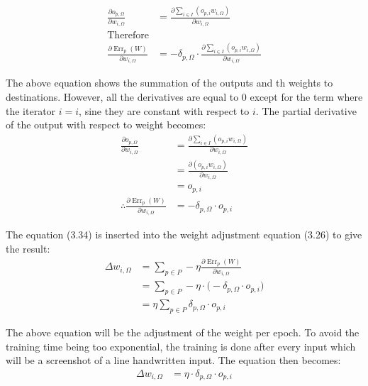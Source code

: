 \begin{align}
\frac { \partial o _ { p , \Omega } } { \partial w _ { i , \Omega } } &= \frac { \partial \sum _ { i \in I } \left( o _ { p , i } w _ { i , \Omega } \right) } { \partial w _ { i , \Omega } } \nonumber \\
\text{Therefore}\\
\frac { \partial \operatorname { Err } _ { p } ( W ) } { \partial w _ { i , \Omega } } &= - \delta _ { p , \Omega } \cdot \frac { \partial \sum _ { i \in I } \left( o _ { p , i } w _ { i , \Omega } \right) } { \partial w _ { i , \Omega } }
\end{align}

The above equation shows the summation of the outputs and th weights to destinations. However, all the derivatives are equal to 0 except for the term where the iterator $i=i$, sine they are constant with respect to $i$. The partial derivative of the output with respect to weight becomes:
\begin{align}
\frac { \partial o _ { p , \Omega } } { \partial w _ { i , \Omega } } &= \frac { \partial \sum _ { i \in I } \left( o _ { p , i } w _ { i , \Omega } \right) } { \partial w _ { i , \Omega } } \nonumber \\
&= \frac { \partial   \left( o _ { p , i } w _ { i , \Omega } \right) } { \partial w _ { i , \Omega } } \nonumber \\
&= o_{p,i}\\
\therefore \frac { \partial \operatorname { Err } _ { p } ( W ) } { \partial w _ { i , \Omega } } &= - \delta _ { p , \Omega } \cdot o_{p,i}
\end{align}

The equation (3.34) is inserted into the weight adjustment equation (3.26) to give the result:
\begin{align}
\Delta w _ { i , \Omega } &= \sum _ { p \in P } - \eta \frac { \partial \operatorname { Err } _ { p } ( W ) } { \partial w _ { i , \Omega } } \nonumber \\
&= \sum _ { p \in P } - \eta \cdot \big(- \delta _ { p , \Omega } \cdot o_{p,i}\big) \nonumber\\
&= \eta \sum _ { p \in P }   \delta _ { p , \Omega } \cdot o_{p,i}
\end{align}

The above equation will be the adjustment of the weight per epoch. To avoid the training time being too exponential, the training is done after every input which will be a screenshot of a line handwritten input. The equation then becomes:
\begin{align}
\Delta w _ { i , \Omega } &= \eta \cdot \delta _ { p , \Omega } \cdot o_{p,i}
\end{align}

